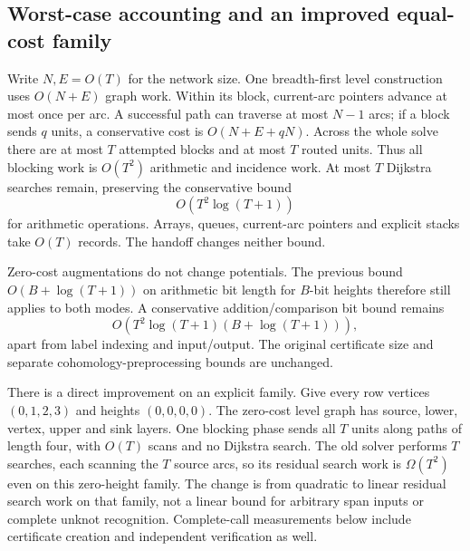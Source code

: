 \subsection{Worst-case accounting and an improved equal-cost family}

Write $N,E=O(T)$ for the network size. One breadth-first level construction
uses $O(N+E)$ graph work. Within its block, current-arc pointers advance
at most once per arc. A successful path can traverse at most $N-1$ arcs;
if a block sends $q$ units, a conservative cost is
$O(N+E+qN)$. Across the whole solve there are at most $T$ attempted
blocks and at most $T$ routed units. Thus all blocking work is
$O(T^2)$ arithmetic and incidence work. At most $T$ Dijkstra searches
remain, preserving the conservative bound
\[
 O(T^2\log(T+1))
\]
for arithmetic operations. Arrays, queues, current-arc pointers and
explicit stacks take $O(T)$ records. The handoff changes neither bound.

Zero-cost augmentations do not change potentials. The previous bound
$O(B+\log(T+1))$ on arithmetic bit length for $B$-bit heights therefore
still applies to both modes. A conservative addition/comparison bit bound
remains
\[
 O\!\left(T^2\log(T+1)(B+\log(T+1))\right),
\]
apart from label indexing and input/output. The original certificate
size and separate cohomology-preprocessing bounds are unchanged.

There is a direct improvement on an explicit family. Give every row
vertices $(0,1,2,3)$ and heights $(0,0,0,0)$. The zero-cost level graph
has source, lower, vertex, upper and sink layers. One blocking phase sends
all $T$ units along paths of length four, with $O(T)$ scans and no
Dijkstra search. The old solver performs $T$ searches, each scanning the
$T$ source arcs, so its residual search work is $\Omega(T^2)$ even on
this zero-height family. The change is from quadratic to linear residual
search work on that family, not a linear bound for arbitrary span inputs
or complete unknot recognition. Complete-call measurements below include
certificate creation and independent verification as well.


